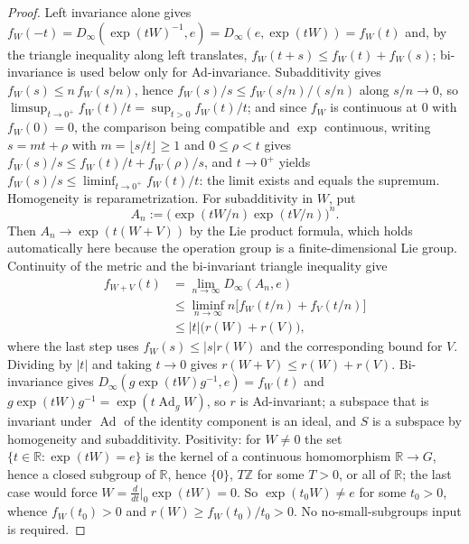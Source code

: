 \documentclass[11pt,a4paper]{article}
\begin{document}
\begin{proof}
Left invariance alone gives
\(f_W(-t)=D_\infty(\exp(tW)^{-1},e)=D_\infty(e,\exp(tW))=f_W(t)\) and, by
the triangle inequality along left translates,
\(f_W(t+s)\le f_W(t)+f_W(s)\); bi-invariance is used below only for
Ad-invariance.  Subadditivity gives
\(f_W(s)\le n\,f_W(s/n)\), hence \(f_W(s)/s\le f_W(s/n)/(s/n)\) along
\(s/n\to0\), so \(\limsup_{t\to0^+}f_W(t)/t=\sup_{t>0}f_W(t)/t\); and
since \(f_W\) is continuous at \(0\) with \(f_W(0)=0\), the comparison
being compatible and \(\exp\) continuous, writing \(s=mt+\rho\) with
\(m=\lfloor s/t\rfloor\ge1\) and \(0\le\rho<t\) gives
\(f_W(s)/s\le f_W(t)/t+f_W(\rho)/s\), and \(t\to0^+\) yields
\(f_W(s)/s\le\liminf_{t\to0^+}f_W(t)/t\): the limit exists and equals
the supremum.  Homogeneity is
reparametrization.  For subadditivity in \(W\), put
\[
 A_n:=\bigl(\exp(tW/n)\exp(tV/n)\bigr)^n.
\]
Then \(A_n\to\exp(t(W+V))\) by the Lie product formula, which holds
automatically here because the operation group is a finite-dimensional Lie
group.  Continuity of the metric and the bi-invariant triangle inequality give
\[
\begin{aligned}
 f_{W+V}(t)
 &=\lim_{n\to\infty}D_\infty(A_n,e)\\
 &\le\liminf_{n\to\infty}
 n\bigl[f_W(t/n)+f_V(t/n)\bigr]\\
 &\le |t|\bigl(r(W)+r(V)\bigr),
\end{aligned}
\]
where the last step uses \(f_W(s)\le |s|r(W)\) and the corresponding bound
for \(V\).  Dividing by \(|t|\) and taking \(t\to0\) gives
\(r(W+V)\le r(W)+r(V)\).  Bi-invariance gives
\(D_\infty(g\exp(tW)g^{-1},e)=f_W(t)\) and
\(g\exp(tW)g^{-1}=\exp(t\operatorname{Ad}_gW)\), so \(r\) is
Ad-invariant; a subspace that is
invariant under \(\operatorname{Ad}\) of the identity component is an
ideal, and \(S\) is a subspace by homogeneity and subadditivity.
Positivity: for \(W\ne0\) the set \(\{t\in\mathbb R:\exp(tW)=e\}\) is the
kernel of a continuous homomorphism \(\mathbb R\to G\), hence a closed
subgroup of \(\mathbb R\), hence \(\{0\}\), \(T\mathbb Z\) for some
\(T>0\), or all of \(\mathbb R\); the last case would force
\(W=\tfrac{d}{dt}\big|_{0}\exp(tW)=0\).  So \(\exp(t_0W)\ne e\) for some
\(t_0>0\), whence \(f_W(t_0)>0\) and \(r(W)\ge f_W(t_0)/t_0>0\).  No
no-small-subgroups input is required.
\end{proof}
\end{document}
